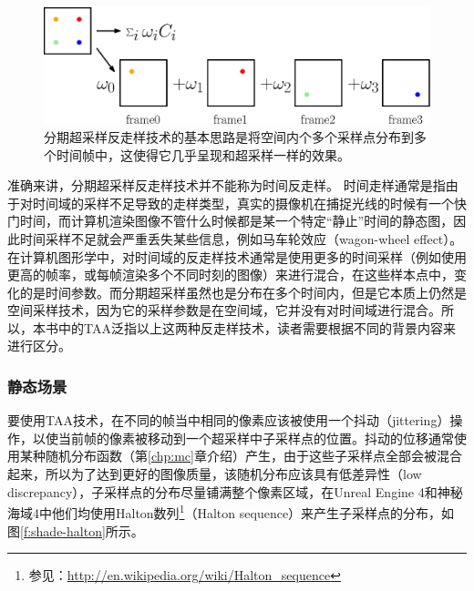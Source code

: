 \begin{figure}
	\includegraphics[width=\textwidth]{figures/shade/taa}
	\caption{分期超采样反走样技术的基本思路是将空间内个多个采样点分布到多个时间帧中，这使得它几乎呈现和超采样一样的效果。}
	\label{f:shade-spatial-to-temporal}
\end{figure}

\begin{shaded}
准确来讲，分期超采样反走样技术并不能称为时间反走样。	时间走样通常是指由于对时间域的采样不足导致的走样类型，真实的摄像机在捕捉光线的时候有一个快门时间，而计算机渲染图像不管什么时候都是某一个特定“静止”时间的静态图，因此时间采样不足就会严重丢失某些信息，例如马车轮效应（wagon-wheel effect）。在计算机图形学中，对时间域的反走样技术通常是使用更多的时间采样（例如使用更高的帧率，或每帧渲染多个不同时刻的图像）来进行混合，在这些样本点中，变化的是时间参数。而分期超采样虽然也是分布在多个时间内，但是它本质上仍然是空间采样技术，因为它的采样参数是在空间域，它并没有对时间域进行混合。所以，本书中的TAA泛指以上这两种反走样技术，读者需要根据不同的背景内容来进行区分。
\end{shaded}






\subsubsection{静态场景}
要使用TAA技术，在不同的帧当中相同的像素应该被使用一个抖动（jittering）操作，以使当前帧的像素被移动到一个超采样中子采样点的位置。抖动的位移通常使用某种随机分布函数（第\ref{chp:mc}章介绍）产生，由于这些子采样点全部会被混合起来，所以为了达到更好的图像质量，该随机分布应该具有低差异性（low discrepancy），子采样点的分布尽量铺满整个像素区域，在Unreal Engine 4和神秘海域4中他们均使用Halton数列\footnote{参见：\url{http://en.wikipedia.org/wiki/Halton_sequence}}（Halton sequence）来产生子采样点的分布，如图\ref{f:shade-halton}所示。

